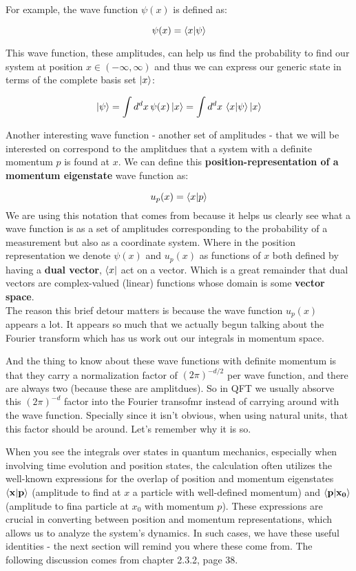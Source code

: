 For example, the wave function $\psi(x)$ is defined as:

$$
\psi(x) = \braket{x | \psi}
$$

This wave function, these amplitudes, can help us find the probability to find our system at position
$x \in \left( -\infty , \infty\right)$ and thus we can express our generic state in terms of the
complete basis set $\ket{x}$:

$$
\ket{\psi} = \int d^d x \, \psi(x) \ket{x} = \int d^d x \, \braket{x | \psi}  \ket{x}
$$

Another interesting wave function - another set of amplitudes - that we will be interested on
correspond to the amplitdues that a system with a definite momentum $p$ is found at $x$.
We can define this \textbf{position-representation of a momentum eigenstate} wave function as:

$$
u_p (x) = \braket{x | p}
$$
We are using this notation that comes from \cite{binney} because it helps us clearly see what a wave function
is as a set of amplitudes corresponding to the probability of a measurement but also
as a coordinate system.
Where in the position representation we denote $\psi(x)$ and $u_p (x)$ as functions of $x$
both defined by having a \textbf{dual vector}, $\bra{x}$ act on a vector.
Which is a great remainder that dual vectors are complex-valued (linear) functions whose domain is some
\textbf{vector space}.
\\

The reason this brief detour matters is because the wave function $u_p (x)$ appears a lot.
It appears so much that we actually begun talking about the Fourier transform which has us work out
our integrals in momentum space.

And the thing to know about these wave functions with definite momentum is that they carry a
normalization factor of $\left(2\pi\right)^{-d/2}$ per wave function, and there are always two
(because these are amplitdues).
So in QFT we usually absorve this $\left(2\pi\right)^{-d}$ factor into the Fourier transofmr instead of
carrying around with the wave function.
Specially since it isn't obvious, when using natural units, that this factor should be around.
Let's remember why it is so.

When you see the integrals over states in quantum mechanics, especially when involving time evolution and position states,
the calculation often utilizes the well-known expressions for the overlap of position and momentum eigenstates
$\braket{\boldsymbol{\mathbf{x}} | \boldsymbol{\mathbf{p}}}$ (amplitude to find at $x$ a particle with well-defined momentum)
and $\braket{\boldsymbol{\mathbf{p}} | \boldsymbol{\mathbf{x_0}}}$ (amplitude to fina particle at $x_0$ with momentum $p$).
These expressions are crucial in converting between position and momentum representations,
which allows us to analyze the system's dynamics.
In such cases, we have these useful identities - the next section will remind you where these come from.
The following discussion comes from \cite{binney} chapter 2.3.2, page 38.


